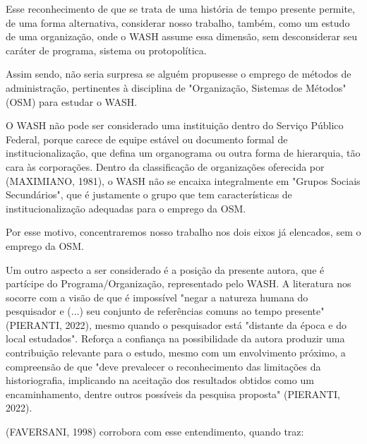 Esse reconhecimento de que se trata de uma história de tempo presente permite, de uma forma alternativa, considerar nosso trabalho, também, como um estudo de uma organização, onde o WASH assume essa dimensão, sem desconsiderar seu caráter de  programa, sistema ou protopolítica.

Assim sendo, não seria surpresa se alguém propusesse o emprego de métodos de administração, pertinentes à disciplina de "Organização, Sistemas de Métodos" (OSM) para estudar o WASH.


\noindent\begin{center}\mbox{\centering{}}\end{center}


O WASH não pode ser considerado uma instituição dentro do Serviço Público Federal, porque carece de equipe estável ou documento formal de institucionalização, que defina um organograma ou outra forma de hierarquia, tão cara às corporações. Dentro da classificação de organizações oferecida por (MAXIMIANO, 1981), o WASH não se encaixa integralmente em "Grupos Sociais Secundários", que é justamente o grupo que tem características de institucionalização adequadas para o emprego da OSM.

Por esse motivo, concentraremos nosso trabalho nos dois eixos já elencados, sem o emprego da OSM.

Um outro aspecto a ser considerado é a posição da presente autora, que é partícipe do Programa/Organização, representado pelo WASH. A literatura nos socorre com a visão de que é impossível "negar a natureza humana do pesquisador e (...) seu conjunto de referências comuns ao tempo presente" (PIERANTI, 2022), mesmo quando o pesquisador está "distante da época e do local estudados". Reforça a confiança na possibilidade da autora produzir uma contribuição relevante para o  estudo, mesmo com um envolvimento próximo, a compreensão de que "deve prevalecer o reconhecimento das limitações da historiografia, implicando na aceitação dos resultados obtidos como um encaminhamento, dentre outros possíveis da pesquisa proposta" (PIERANTI, 2022).

(FAVERSANI, 1998) corrobora com esse entendimento, quando traz:


\noindent\begin{center}\mbox{\centering{}}\end{center}


